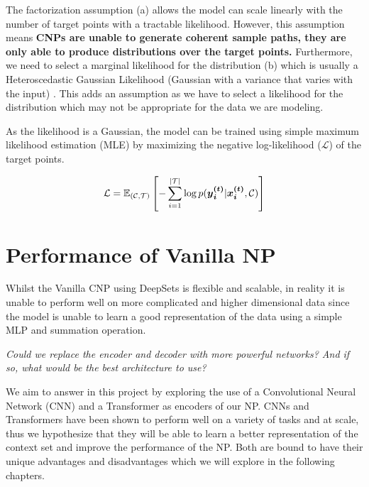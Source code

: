 \documentclass[../../main.tex]{subfiles}
\begin{document}
The  factorization assumption (a) allows the model can scale linearly with the number of target points with a tractable likelihood. However, this assumption means
\textbf{CNPs are unable to generate coherent sample paths, they are only able to produce distributions over the target points.} Furthermore, we need to select a marginal likelihood for the distribution (b) which is usually a Heteroscedastic Gaussian Likelihood (Gaussian with a variance that varies with the input) \cite{garnelo2018conditional}. This adds an assumption as we have to select a likelihood for the distribution which may not be appropriate for the data we are modeling.

As the likelihood is a Gaussian, the model can be trained using simple maximum likelihood estimation (MLE) by maximizing the negative log-likelihood ($\mathcal{L}$) of the target points.

\begin{equation}
    \mathcal{L} = \mathbb{E}_{(\mathcal{C}, \mathcal{T})} \left[- \sum_{i=1}^{|\mathcal{T}|} \log p(\bm{{y}_i^{(t)}} | \bm{{x}_i^{(t)}}, \mathcal{C})\right]
\end{equation}




\section{Performance of Vanilla NP}

Whilst the Vanilla CNP using DeepSets is flexible and scalable, in reality it is unable to perform well on more complicated and higher dimensional data since the model is unable to learn a good representation of the data using a simple MLP and summation operation. 

\emph{Could we replace the encoder and decoder with more powerful networks? And if so, what would be the best architecture to use?} 

We aim to answer in this project by exploring the use of a Convolutional Neural Network (CNN) and a Transformer as encoders of our NP. CNNs and Transformers have been shown to perform well on a variety of tasks and at scale, thus we hypothesize that they will be able to learn a better representation of the context set and improve the performance of the NP.
Both are bound to have their unique advantages and disadvantages which we will explore in the following chapters.



\end{document}
